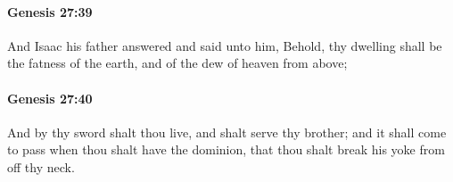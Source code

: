		\paragraph{Genesis 27:39} %
			\label{GENESIS-27-39}

			And Isaac his father answered and said unto him, Behold, thy dwelling shall be the fatness of the earth, and of the dew of heaven from above;


		\paragraph{Genesis 27:40} %
			\label{GENESIS-27-40}

			And by thy sword shalt thou live, and shalt serve thy brother; and it shall come to pass when thou shalt have the dominion, that thou shalt break his yoke from off thy neck.


